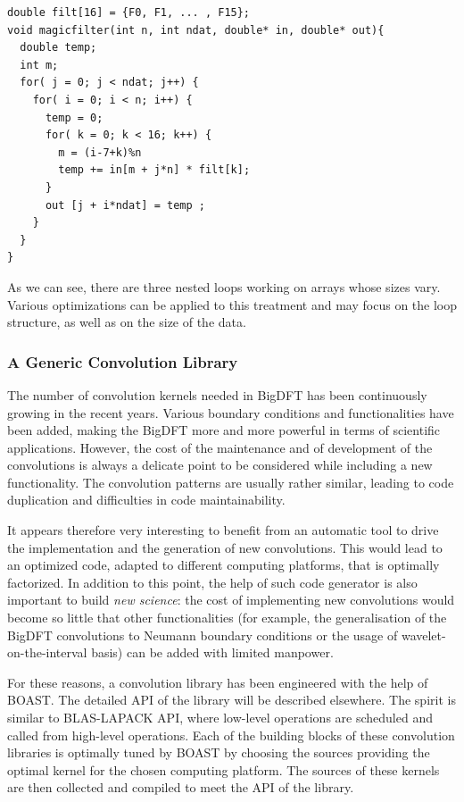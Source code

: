 \documentclass[11pt, a4paper, twoside]{montblanc}
\begin{document}
\begin{lstlisting}
double filt[16] = {F0, F1, ... , F15};
void magicfilter(int n, int ndat, double* in, double* out){
  double temp;
  int m;
  for( j = 0; j < ndat; j++) {
    for( i = 0; i < n; i++) {
      temp = 0;
      for( k = 0; k < 16; k++) {
        m = (i-7+k)%n
        temp += in[m + j*n] * filt[k];
      }
      out [j + i*ndat] = temp ;
    } 
  }
} 
\end{lstlisting}

As we can see, there are three nested loops working on arrays whose sizes vary.
Various optimizations can be applied to this treatment and may focus on the
loop structure, as well as on the size of the data. 

    \subsubsection{A Generic Convolution Library}

The number of convolution kernels needed in BigDFT has been continuously
growing in the recent years.  Various boundary conditions and functionalities
have been added, making the BigDFT more and more powerful in terms of
scientific applications.  However, the cost of the maintenance and of
development of the convolutions is always a delicate point to be considered
while including a new functionality.  The convolution patterns are usually
rather similar, leading to code duplication and difficulties in code
maintainability.

It appears therefore very interesting to benefit from an automatic tool to drive
the implementation and the generation of new convolutions.  This would lead to
an optimized code, adapted to different computing platforms, that is optimally
factorized.  In addition to this point, the help of such code generator is also
important to build \emph{new science}: the cost of implementing new
convolutions would become so little that other functionalities (for example,
the generalisation of the BigDFT convolutions to Neumann boundary conditions
or the usage of wavelet-on-the-interval basis) can be added with limited
manpower.

For these reasons, a convolution library has been engineered with the help of
BOAST.  The detailed API of the library will be described elsewhere.  The
spirit is similar to BLAS-LAPACK API, where low-level operations are scheduled
and called from high-level operations.  Each of the building blocks of these
convolution libraries is optimally tuned by BOAST by choosing the sources
providing the optimal kernel for the chosen computing platform.  The sources of
these kernels are then collected and compiled to meet the API of the library.
\end{document}
